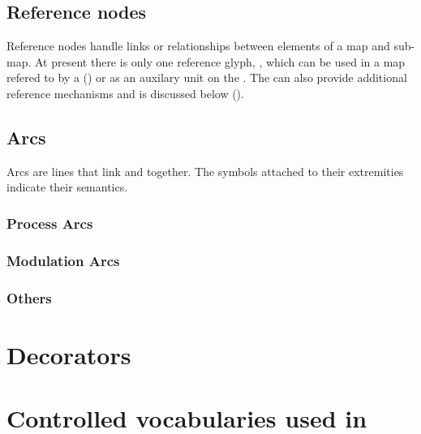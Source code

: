 



\subsection{Reference nodes}

Reference nodes handle links or relationships between elements of a
map and sub-map. At present there is only one reference glyph,
, which can be used in a map refered to by a 
() or as an auxilary unit on the . The
 can also provide additional reference mechanisms
and is discussed below ().



\subsection{Arcs}\label{sec:arcs}

Arcs are lines that link  and  together.  The symbols attached to their extremities indicate their semantics.

\subsubsection{Process Arcs}




\subsubsection{Modulation Arcs}







\subsubsection{Others}




\section{Decorators}



\section{Controlled vocabularies used in \SBGNPDLone}\label{sec:CVs}




